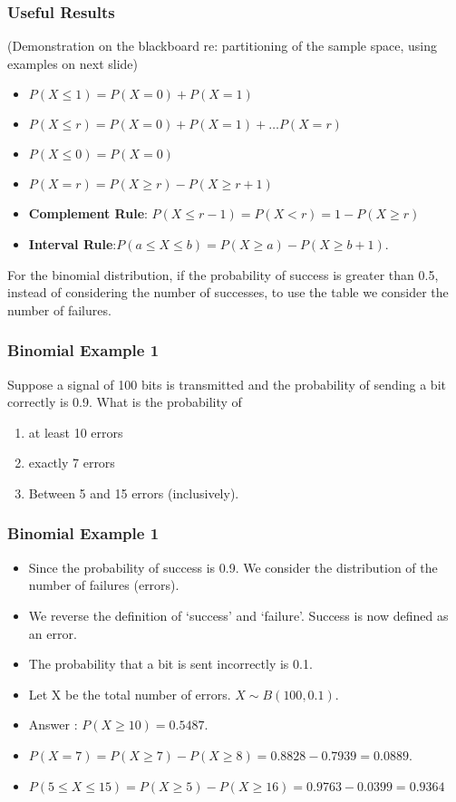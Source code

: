 \documentclass[a4]{beamer}
\begin{document}
\begin{frame}
\frametitle{Useful Results}
(Demonstration on the blackboard re: partitioning of the sample space, using examples on next slide)
\begin{itemize}
\item $P(X \leq 1) = P(X=0) + P(X=1)$
\item $P(X \leq r) = P(X=0)+ P(X=1) + \ldots P(X= r)$
\item $P(X \leq 0) = P(X=0)$
\item $P(X = r) = P(X \geq r ) - P(X \geq r + 1)$
\item \textbf{Complement Rule}: $P(X \leq r-1) = P(X < r) = 1 - P(X \geq r)$
\item \textbf{Interval Rule}:$ P(a \leq X \leq  b)= P(X \geq a) - P(X \geq b + 1).$
\end{itemize}
For the binomial distribution, if the probability of success is greater than 0.5, instead of
considering the number of successes, to use the table we consider
the number of failures.
\end{frame}


\begin{frame}
\frametitle{Binomial Example 1}
Suppose a signal of 100 bits is transmitted and the probability of
sending a bit correctly is 0.9. What is the probability of
\begin{enumerate}
\item at least 10 errors
\item exactly 7 errors
\item Between 5 and 15 errors (inclusively).
\end{enumerate}
\end{frame}
\begin{frame}
\frametitle{Binomial Example 1}
\begin{itemize}
\item Since the probability of success is 0.9. We consider the distribution
of the number of failures (errors).
\item We reverse the definition of `success' and `failure'. Success is now defined as an error.
\item The probability that a bit is sent incorrectly is 0.1.
\item Let X be the total number of errors. $X \sim B(100, 0.1)$.
\item Answer : $P(X \geq 10) = 0.5487$.
\item $P(X = 7)=P(X \geq 7) - P(X \geq 8) =0.8828 - 0.7939 = 0.0889$.
\item $P(5 \leq X  \leq 15) = P(X \geq 5) - P(X \geq 16) =0.9763 - 0.0399 = 0.9364$
\end{itemize}
\end{frame}
\end{document}
